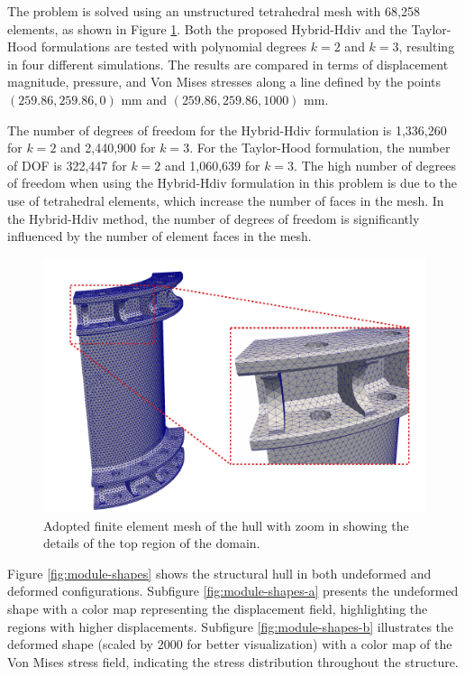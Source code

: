 \documentclass[english,11pt,3p,number,sort&compress]{elsarticle}
\begin{document}
The problem is solved using an unstructured tetrahedral mesh with 68,258 elements, as shown in Figure \ref{fig:module-mesh}. Both the proposed Hybrid-Hdiv and the Taylor-Hood formulations are tested with polynomial degrees $k=2$ and $k=3$, resulting in four different simulations. The results are compared in terms of displacement magnitude, pressure, and Von Mises stresses along a line defined by the points $(259.86, 259.86, 0)$ mm and $(259.86, 259.86, 1000)$ mm. 

The number of degrees of freedom  for the Hybrid-Hdiv formulation is 1,336,260 for $k=2$ and 2,440,900 for $k=3$. For the Taylor-Hood formulation, the number of DOF is 322,447 for $k=2$ and 1,060,639 for $k=3$. The high number of degrees of freedom when using the Hybrid-Hdiv formulation in this problem is due to the use of tetrahedral elements, which increase the number of faces in the mesh. In the Hybrid-Hdiv method, the number of degrees of freedom is significantly influenced by the number of element faces in the mesh.

\begin{figure}[h]
	\centering
	\includegraphics[scale=0.75]{hull-mesh.pdf}
	\caption{Adopted finite element mesh of the hull with zoom in showing the details of the top region of the domain.}
	\label{fig:module-mesh}
\end{figure}

Figure \ref{fig:module-shapes} shows the structural hull in both undeformed and deformed configurations. Subfigure \ref{fig:module-shapes-a} presents the undeformed shape with a color map representing the displacement field, highlighting the regions with higher displacements. Subfigure \ref{fig:module-shapes-b} illustrates the deformed shape (scaled by 2000 for better visualization) with a color map of the Von Mises stress field, indicating the stress distribution throughout the structure.
\end{document}
